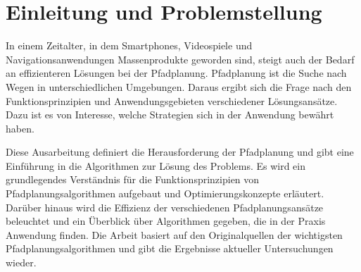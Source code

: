 \pagestyle{plain}
\chapter{Einleitung und Problemstellung}

In einem Zeitalter, in dem Smartphones, Videospiele und Navigationsanwendungen Massenprodukte geworden sind, steigt auch der Bedarf an effizienteren Lösungen bei der Pfadplanung. Pfadplanung ist die Suche nach Wegen in unterschiedlichen Umgebungen. Daraus ergibt sich die Frage nach den Funktionsprinzipien und Anwendungsgebieten verschiedener Lösungsansätze. Dazu ist es von Interesse, welche Strategien sich in der Anwendung bewährt haben. 

Diese Ausarbeitung definiert die Herausforderung der Pfadplanung und gibt eine Einführung in die Algorithmen zur Lösung des Problems. Es wird ein grundlegendes Verständnis für die Funktionsprinzipien von Pfadplanungsalgorithmen aufgebaut und Optimierungskonzepte erläutert. Darüber hinaus wird die Effizienz der verschiedenen Pfadplanungsansätze beleuchtet und ein Überblick über Algorithmen gegeben, die in der Praxis Anwendung finden. Die Arbeit basiert auf den Originalquellen der wichtigsten Pfadplanungsalgorithmen und gibt die Ergebnisse aktueller Untersuchungen wieder.
 






